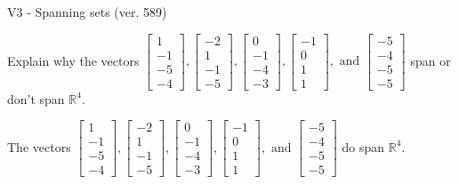\begin{exercise}
  \begin{exerciseTitle}V3 - Spanning sets (ver. 589)\end{exerciseTitle}
  \begin{exerciseStatement}
    Explain why the vectors \(\left[\begin{array}{r}
1 \\
-1 \\
-5 \\
-4
\end{array}\right] , \left[\begin{array}{r}
-2 \\
1 \\
-1 \\
-5
\end{array}\right] , \left[\begin{array}{r}
0 \\
-1 \\
-4 \\
-3
\end{array}\right] , \left[\begin{array}{r}
-1 \\
0 \\
1 \\
1
\end{array}\right] , \text{ and } \left[\begin{array}{r}
-5 \\
-4 \\
-5 \\
-5
\end{array}\right]\) span or don't span \(\mathbb{R}^4\). 
	


  \end{exerciseStatement}
  \begin{exerciseAnswer}
   The vectors \(\left[\begin{array}{r}
1 \\
-1 \\
-5 \\
-4
\end{array}\right] , \left[\begin{array}{r}
-2 \\
1 \\
-1 \\
-5
\end{array}\right] , \left[\begin{array}{r}
0 \\
-1 \\
-4 \\
-3
\end{array}\right] , \left[\begin{array}{r}
-1 \\
0 \\
1 \\
1
\end{array}\right] , \text{ and } \left[\begin{array}{r}
-5 \\
-4 \\
-5 \\
-5
\end{array}\right]\) 
  	 do  
	span \(\mathbb{R}^4\).
  



\end{exerciseAnswer}
\end{exercise}
